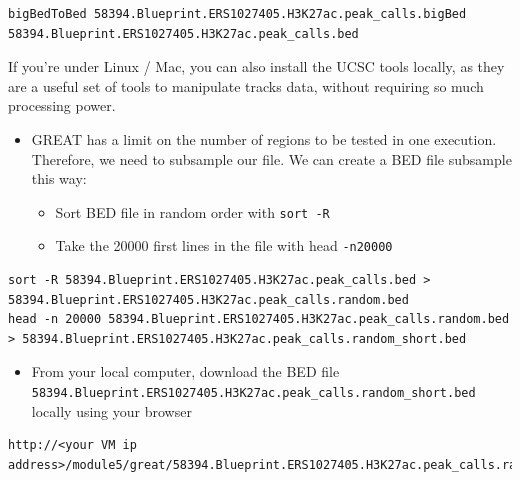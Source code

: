 \documentclass[
]{book}
\providecommand{\tightlist}{%
  \setlength{\itemsep}{0pt}\setlength{\parskip}{0pt}}
\begin{document}
\begin{verbatim}
bigBedToBed 58394.Blueprint.ERS1027405.H3K27ac.peak_calls.bigBed 58394.Blueprint.ERS1027405.H3K27ac.peak_calls.bed
\end{verbatim}

If you're under Linux / Mac, you can also install the UCSC tools locally, as they are a useful set of tools to manipulate tracks data, without requiring so much processing power.

\begin{itemize}
\tightlist
\item
  GREAT has a limit on the number of regions to be tested in one execution. Therefore, we need to subsample our file. We can create a BED file subsample this way:

  \begin{itemize}
  \tightlist
  \item
    Sort BED file in random order with \texttt{sort\ -R}
  \item
    Take the 20000 first lines in the file with head \texttt{-n20000}
  \end{itemize}
\end{itemize}

\begin{verbatim}
sort -R 58394.Blueprint.ERS1027405.H3K27ac.peak_calls.bed > 58394.Blueprint.ERS1027405.H3K27ac.peak_calls.random.bed
head -n 20000 58394.Blueprint.ERS1027405.H3K27ac.peak_calls.random.bed > 58394.Blueprint.ERS1027405.H3K27ac.peak_calls.random_short.bed
\end{verbatim}

\begin{itemize}
\tightlist
\item
  From your local computer, download the BED file \texttt{58394.Blueprint.ERS1027405.H3K27ac.peak\_calls.random\_short.bed} locally using your browser
\end{itemize}

\begin{verbatim}
http://<your VM ip address>/module5/great/58394.Blueprint.ERS1027405.H3K27ac.peak_calls.random_short.bed
\end{verbatim}
\end{document}
